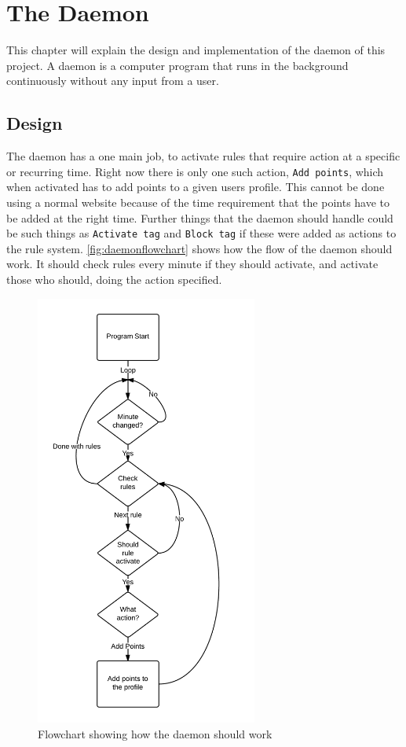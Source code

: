 \chapter{The Daemon}
\label{chap:daemon}
This chapter will explain the design and implementation of the daemon of this project. A daemon is a computer program that runs in the background continuously without any input from a user.
\section{Design}
The daemon has a one main job, to activate rules that require action at a specific or recurring time. Right now there is only one such action, \texttt{Add points}, which when activated has to add points to a given users profile. This cannot be done using a normal website because of the time requirement that the points have to be added at the right time. Further things that the daemon should handle could be such things as \texttt{Activate tag} and \texttt{Block tag} if these were added as actions to the rule system. \autoref{fig:daemonflowchart} shows how the flow of the daemon should work. It should check rules every minute if they should activate, and activate those who should, doing the action specified.

\begin{figure}[!h]
	\centering
		\includegraphics[width=0.65\textwidth]{images/daemonflowchart.png}
	\caption{Flowchart showing how the daemon should work}
	\label{fig:daemonflowchart}
\end{figure}

